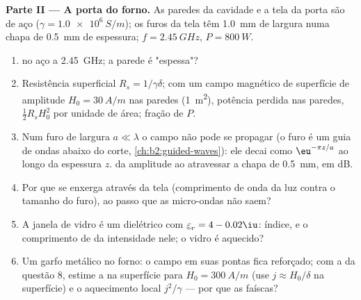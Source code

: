 \begin{problem}
\medskip
\noindent\textbf{Parte II --- A porta do forno.}
As paredes da cavidade e a tela da porta são de aço ($\gamma = \qty{1.0e6}{S/m}$);
os furos da tela têm \qty{1.0}{mm} de largura numa chapa de \qty{0.5}{mm} de espessura;
$f = \qty{2.45}{GHz}$, $P = \qty{800}{W}$.
\begin{enumerate}[resume]
  \item {} no aço a \qty{2.45}{GHz}; a parede é "espessa"?
  \item Resistência superficial $R_s = 1/\gamma\delta$; com um campo magnético de
        superfície de amplitude $H_0 = \qty{30}{A/m}$ nas paredes (\qty{1}{m^2}),
        potência perdida nas paredes, $\tfrac12R_sH_0^2$ por unidade de área; fração
        de $P$.
  \item Num furo de largura $a \ll \lambda$ o campo não pode se propagar (o
        furo é um guia de ondas abaixo do corte, \cref{ch:b2:guided-waves}):
        ele decai como $\eu^{-\pi z/a}$ ao longo da espessura $z$. 
        da amplitude ao atravessar a chapa de \qty{0.5}{mm}, em dB.
  \item Por que se enxerga através da tela (comprimento de onda da luz
        contra o tamanho do furo), ao passo que as micro-ondas não saem?
  \item A janela de vidro é um dielétrico com $\underline\varepsilon_r = 4 - 0.02\iu$:
        índice, e o comprimento de  da intensidade nele; o
        vidro é aquecido?
  \item Um garfo metálico no forno: o campo em suas pontas fica reforçado;
        com a  da questão 8, estime a  na superfície para $H_0 = \qty{300}{A/m}$ (use $j \approx H_0/\delta$
        na superfície) e o aquecimento local $j^2/\gamma$ --- por que as faíscas?
\end{enumerate}


\end{problem}
